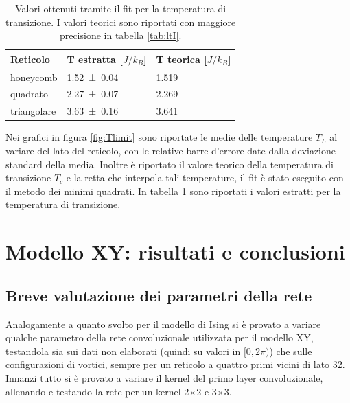 \documentclass{article}
\begin{document}
\begin{table}[!ht]
\begin{center}
\begin{tabular}{lll}
\toprule
Reticolo & T estratta [$J/k_B$] & T teorica [$J/k_B$] \\
\midrule
honeycomb & \num{1.52 \pm 0.04} & \num{1.519} \\
quadrato & \num{2.27 \pm 0.07} & \num{2.269} \\
triangolare & \num{3.63 \pm 0.16} & \num{3.641} \\
\bottomrule
\end{tabular}
\end{center}
\caption{Valori ottenuti tramite il fit per la temperatura di transizione. I valori teorici sono riportati con maggiore precisione in tabella \ref{tab:ltI}.}
\label{tab:Tising}
\end{table}

Nei grafici in figura \ref{fig:Tlimit} sono riportate le medie delle temperature $T_L$ al variare del lato del reticolo, con le relative barre d'errore date dalla deviazione standard della media.
Inoltre è riportato il valore teorico della temperatura di transizione $T_c$ e la retta che interpola tali temperature, il fit è stato eseguito con il metodo dei minimi quadrati.
In tabella \ref{tab:Tising} sono riportati i valori estratti per la temperatura di transizione.


\section{Modello XY: risultati e conclusioni}
\subsection{Breve valutazione dei parametri della rete}
Analogamente a quanto svolto per il modello di Ising si è provato a variare qualche parametro della rete convoluzionale utilizzata per il modello XY, testandola sia sui dati non elaborati (quindi su valori in $[0, 2\pi)$) che sulle configurazioni di vortici, sempre per un reticolo a quattro primi vicini di lato 32.
Innanzi tutto si è provato a variare il kernel del primo layer convoluzionale, allenando e testando la rete per un kernel 2$\times$2 e 3$\times$3.
\end{document}
